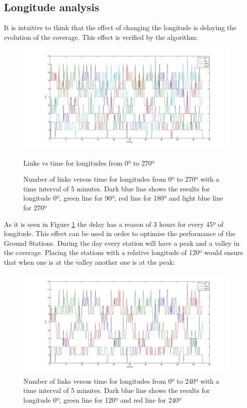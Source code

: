 \subsection{Longitude analysis}
It is intuitive to think that the effect of changing the longitude is delaying the evolution of the coverage. This effect is verified by the algorithm:
\begin{figure}[H]
\begin{center}
\includegraphics[scale=0.30]{0_90_270_long.jpg}
\caption{Links vs time for longitudes from 0º to 270º}
\caption[Links vs time for longitudes from 0º to 270º]{Number of links versus time for longitudes from 0º to 270º with a time interval of 5 minutes. Dark blue line shows the results for longitude 0º, green line for 90º, red line for 180º and light blue line for 270º}
\label{fig:long1}
\end{center}
\end{figure}
As it is seen in Figure \ref{fig:long1} the delay has a reason of 3 hours for every 45º of longitude. This effect can be used in order to optimise the performance of the Ground Stations. During the day every station will have a peak and a valley in the coverage. Placing the stations with a relative longitude of 120º would ensure that when one is at the valley another one is at the peak:
\begin{figure}[H]
\begin{center}
\includegraphics[scale=0.30]{0_120_240_long.jpg}
\caption[Links vs time for longitudes from 0º to 240º]{Number of links versus time for longitudes from 0º to 240º with a time interval of 5 minutes. Dark blue line shows the results for longitude 0º, green line for 120º and red line for 240º}
\label{fig:long2}
\end{center}
\end{figure}
